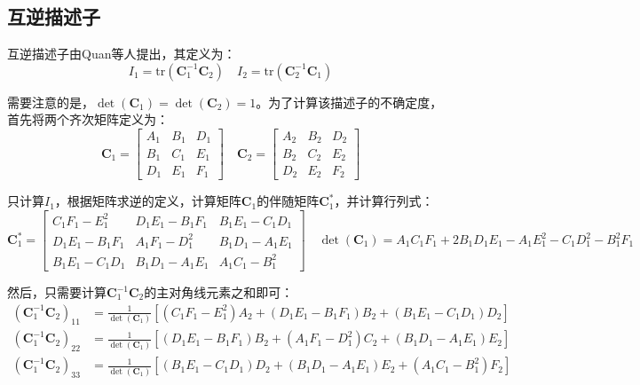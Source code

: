\documentclass{article}
\begin{document}
\subsection{互逆描述子}
互逆描述子由Quan\cite{quanInvariantsPairConics1992}等人提出，其定义为：
\begin{equation*}
  I_1 = \mathrm{tr}(\mathbf{C}_1^{-1}\mathbf{C}_2)\quad I_2 = \mathrm{tr}(\mathbf{C}_2^{-1}\mathbf{C}_1)
\end{equation*}\par
需要注意的是，$\det(\mathbf{C}_1)=\det(\mathbf{C}_2)=1$。为了计算该描述子的不确定度，首先将两个齐次矩阵定义为：
\begin{equation*}
  \mathbf{C}_1=\begin{bmatrix}
    A_1&B_1&D_1\\
    B_1&C_1&E_1\\
    D_1&E_1&F_1
  \end{bmatrix}\quad\mathbf{C}_2=\begin{bmatrix}
    A_2&B_2&D_2\\
    B_2&C_2&E_2\\
    D_2&E_2&F_2
  \end{bmatrix}
\end{equation*}\par
只计算$I_1$，根据矩阵求逆的定义，计算矩阵$\mathbf{C}_1$的伴随矩阵$\mathbf{C}_1^*$，并计算行列式：
\begin{equation*}
  \mathbf{C}_1^*=\begin{bmatrix}
   C_1F_1-E_1^2 & D_1E_1-B_1F_1 & B_1E_1-C_1D_1\\
    D_1E_1-B_1F_1 & A_1F_1-D_1^2 & B_1D_1-A_1E_1\\
    B_1E_1-C_1D_1 & B_1D_1-A_1E_1 & A_1C_1-B_1^2
  \end{bmatrix}\quad\det(\mathbf{C}_1)=A_1C_1F_1+2B_1D_1E_1-A_1E_1^2-C_1D_1^2-B_1^2F_1
\end{equation*}\par
然后，只需要计算$\mathbf{C}_1^{-1}\mathbf{C}_2$的主对角线元素之和即可：
\begin{align*}
 ( \mathbf{C}_1^{-1}\mathbf{C}_2)_{11}&= \frac{1}{\det(\mathbf{C}_1)}\left[(C_1F_1-E_1^2)A_2+(D_1E_1-B_1F_1)B_2+(B_1E_1-C_1D_1)D_2\right]\\
  ( \mathbf{C}_1^{-1}\mathbf{C}_2)_{22}&= \frac{1}{\det(\mathbf{C}_1)}\left[(D_1E_1-B_1F_1)B_2+(A_1F_1-D_1^2)C_2+(B_1D_1-A_1E_1)E_2\right]\\
  ( \mathbf{C}_1^{-1}\mathbf{C}_2)_{33}&= \frac{1}{\det(\mathbf{C}_1)}\left[(B_1E_1-C_1D_1)D_2+(B_1D_1-A_1E_1)E_2+(A_1C_1-B_1^2)F_2\right]
\end{align*}\par
\end{document}
